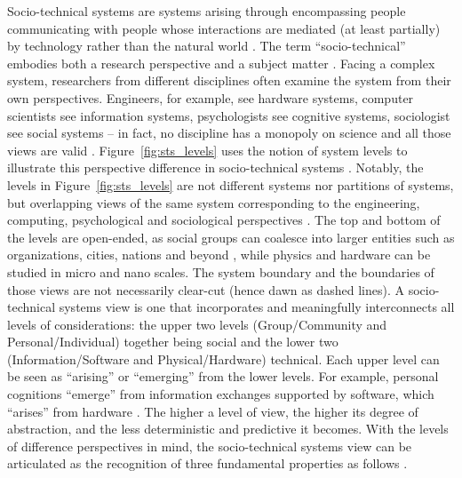 Socio-technical systems are systems arising through encompassing people communicating with people whose interactions are mediated (at least partially) by technology rather than the natural world \cite{Whitworth2009}.
The term ``socio-technical'' embodies both a research perspective and a subject matter \cite{Lee2001}. Facing a complex system, researchers from different disciplines often examine the system from their own perspectives. Engineers, for example, see hardware systems, computer scientists see information systems, psychologists see cognitive systems, sociologist see social systems -- in fact, no discipline has a monopoly on science and all those views are valid \cite{Whitworth2013}. 
Figure~\ref{fig:sts_levels} uses the notion of system levels to illustrate this perspective difference in socio-technical systems \cite{Whitworth2009,Whitworth2013}. Notably, the levels in Figure~\ref{fig:sts_levels} are not different systems nor partitions of systems, but overlapping views of the same system corresponding to the engineering, computing, psychological and sociological perspectives \cite{Whitworth2009}. The top and bottom of the levels are open-ended, 
as social groups can coalesce into larger entities such as organizations, cities, nations and beyond \cite{Whitworth2009a}, while physics and hardware can be studied in micro and nano scales. The system boundary and the boundaries of those views are not necessarily clear-cut (hence dawn as dashed lines). A socio-technical systems view is one that incorporates and meaningfully interconnects all levels of considerations: the upper two levels (Group/Community and Personal/Individual) together being social and the lower two (Information/Software and Physical/Hardware) technical. Each upper level can be seen as   ``arising'' or ``emerging'' from the lower levels. For example, personal cognitions ``emerge'' from information exchanges supported by software, which ``arises'' from hardware \cite{Whitworth2009}. The higher a level of view, the higher its degree of abstraction, and the less deterministic and predictive it becomes.  
% 
With the levels of difference perspectives in mind, the socio-technical systems view can be articulated as the recognition of three fundamental properties as follows \cite{Sawyer2014}. 
%
%

